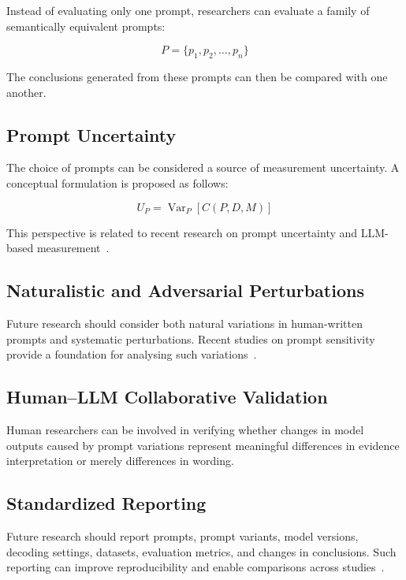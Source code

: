 \documentclass[acmsmall,screen,review]{acmart}
\begin{document}
Instead of evaluating only one prompt, researchers can evaluate a family of semantically equivalent prompts:

\begin{equation}
P=\{p_1,p_2,\ldots,p_n\}
\label{eq:prompt-family}
\end{equation}

The conclusions generated from these prompts can then be compared with one another.

\subsection{Prompt Uncertainty}

The choice of prompts can be considered a source of measurement uncertainty. A conceptual formulation is proposed as follows:

\begin{equation}
U_P=\operatorname{Var}_{P}[C(P,D,M)]
\label{eq:prompt-uncertainty}
\end{equation}

This perspective is related to recent research on prompt uncertainty and LLM-based measurement~\cite{leng2026}.

\subsection{Naturalistic and Adversarial Perturbations}

Future research should consider both natural variations in human-written prompts and systematic perturbations. Recent studies on prompt sensitivity provide a foundation for analysing such variations~\cite{liu_chu2026,qin2026}.

\subsection{Human--LLM Collaborative Validation}

Human researchers can be involved in verifying whether changes in model outputs caused by prompt variations represent meaningful differences in evidence interpretation or merely differences in wording.

\subsection{Standardized Reporting}

Future research should report prompts, prompt variants, model versions, decoding settings, datasets, evaluation metrics, and changes in conclusions. Such reporting can improve reproducibility and enable comparisons across studies~\cite{magnusson2023}.
\end{document}
